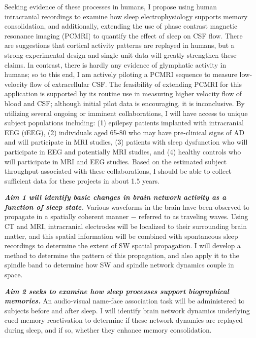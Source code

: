 Seeking evidence of these processes in humans, I propose using human intracranial recordings to examine how sleep electrophysiology supports memory consolidation, and additionally, extending the use of phase contrast magnetic resonance imaging (PCMRI) to quantify the effect of sleep on CSF flow. There are suggestions that cortical activity patterns are replayed in humans, but a strong experimental design and single unit data will greatly strengthen these claims. In contrast, there is hardly any evidence of glymphatic activity in humans; so to this end, I am actively piloting a PCMRI sequence to measure low-velocity flow of extracellular CSF. The feasibility of extending PCMRI for this application is supported by its routine use in measuring higher velocity flow of blood and CSF; although initial pilot data is encouraging, it is inconclusive. By utilizing several ongoing or imminent collaborations, I will have access to unique subject populations including: (1) epilepsy patients implanted with intracranial EEG (iEEG), (2) individuals aged 65-80 who may have pre-clinical signs of AD and will participate in MRI studies, (3) patients with sleep dysfunction who will participate in EEG and potentially MRI studies, and (4) healthy controls who will participate in MRI and EEG studies. Based on the estimated subject throughput associated with these collaborations, I should be able to collect sufficient data for these projects in about 1.5 years.


\textbf{\textit{Aim 1 will identify basic changes in brain network activity as a function of sleep state.}} Various waveforms in the brain have been observed to propagate in a spatially coherent manner $-$ referred to as traveling waves. Using CT and MRI, intracranial electrodes will be localized to their surrounding brain matter, and this spatial information will be combined with spontaneous sleep recordings to determine the extent of SW spatial propagation. I will develop a method to determine the pattern of this propagation, and also apply it to the spindle band to determine how SW and spindle network dynamics couple in space. 

\textbf{\textit{Aim 2 seeks to examine how sleep processes support biographical memories.}} An audio-visual name-face association task will be administered to subjects before and after sleep. I will identify brain network dynamics underlying cued memory reactivation to determine if these network dynamics are replayed during sleep, and if so, whether they enhance memory consolidation.  


